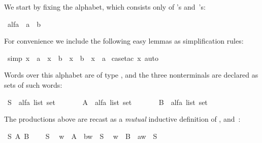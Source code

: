 \begin{isabellebody}
\begin{isamarkuptext}
We start by fixing the alphabet, which consists only of 's
and~'s:%
\end{isamarkuptext}%
\isamarkuptrue%
\isamarkupfalse%
\ alfa\ {\isacharequal}\ a\ {\isacharbar}\ b%
\begin{isamarkuptext}%
\noindent
For convenience we include the following easy lemmas as simplification rules:%
\end{isamarkuptext}%
\isamarkuptrue%
\isamarkupfalse%
\ {\isacharbrackleft}simp{\isacharbrackright}{\isacharcolon}\ {\isachardoublequoteopen}{\isacharparenleft}x\ {\isasymnoteq}\ a{\isacharparenright}\ {\isacharequal}\ {\isacharparenleft}x\ {\isacharequal}\ b{\isacharparenright}\ {\isasymand}\ {\isacharparenleft}x\ {\isasymnoteq}\ b{\isacharparenright}\ {\isacharequal}\ {\isacharparenleft}x\ {\isacharequal}\ a{\isacharparenright}{\isachardoublequoteclose}\isanewline
%
\isadelimproof
%
\endisadelimproof
%
\isatagproof
{}\isamarkupfalse%
\ {\isacharparenleft}case{\isacharunderscore}tac\ x{\isacharcomma}\ auto{\isacharparenright}%
\endisatagproof
{\isafoldproof}%
%
\isadelimproof
%
\endisadelimproof
%
\begin{isamarkuptext}%
\noindent
Words over this alphabet are of type , and
the three nonterminals are declared as sets of such words:%
\end{isamarkuptext}%
\isamarkuptrue%
\isamarkupfalse%
\ S\ {\isacharcolon}{\isacharcolon}\ {\isachardoublequoteopen}alfa\ list\ set{\isachardoublequoteclose}\isanewline
\ \ \ \ \ \ \ A\ {\isacharcolon}{\isacharcolon}\ {\isachardoublequoteopen}alfa\ list\ set{\isachardoublequoteclose}\isanewline
\ \ \ \ \ \ \ B\ {\isacharcolon}{\isacharcolon}\ {\isachardoublequoteopen}alfa\ list\ set{\isachardoublequoteclose}%
\begin{isamarkuptext}%
\noindent
The productions above are recast as a \emph{mutual} inductive
definition
of ,  and~:%
\end{isamarkuptext}%
\isamarkuptrue%
\isamarkupfalse%
\ S\ A\ B\isanewline
{}\isanewline
\ \ {\isachardoublequoteopen}{\isacharbrackleft}{\isacharbrackright}\ {\isasymin}\ S{\isachardoublequoteclose}\isanewline
\ \ {\isachardoublequoteopen}w\ {\isasymin}\ A\ {\isasymLongrightarrow}\ b{\isacharhash}w\ {\isasymin}\ S{\isachardoublequoteclose}\isanewline
\ \ {\isachardoublequoteopen}w\ {\isasymin}\ B\ {\isasymLongrightarrow}\ a{\isacharhash}w\ {\isasymin}\ S{\isachardoublequoteclose}\isanewline

\end{isabellebody}
